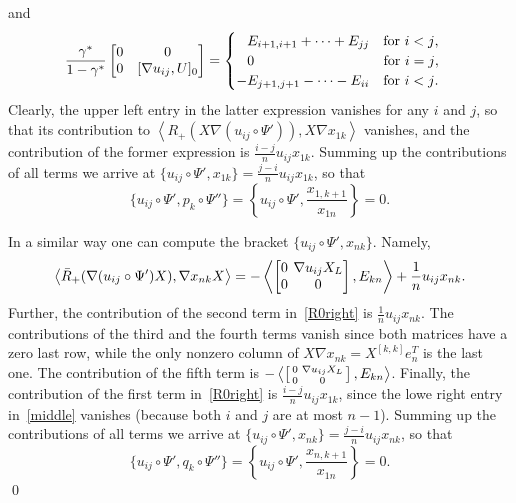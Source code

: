 \documentclass{amsart}
\theoremstyle{definition}
\theoremstyle{remark}
\numberwithin{equation}{section}
\numberwithin{theorem}{section}
\def\nablac{{\nabla}}
\def\nar{\setlength\arraycolsep{2pt}}
\begin{document}
and
\begin{equation}\label{middle}
\frac{\gamma^*}{1-\gamma^*}\begin{bmatrix} 0 & 0\cr 0 & 
[\nablac u_{ij}, U]_0\end{bmatrix}=\begin{cases} \phantom{-}E_{i+1,i+1}+\dots+E_{jj}\quad\text{for $i<j$},\\
                                                 \phantom{-}0\qquad\qquad\qquad\qquad\quad\;\text{for $i=j$},\\
																								 -E_{j+1,j+1}-\dots-E_{ii}\quad\text{for $i<j$}.
																								\end{cases}
\end{equation}
Clearly, the upper left entry in the latter expression vanishes for any $i$ and $j$, so that its contribution
to $\left\langle R_+(X\nabla (u_{ij}\circ\Psi')),X\nabla x_{1k}\right\rangle$ vanishes, and the contribution of
the former expression is $\frac{i-j}n u_{ij}x_{1k}$. Summing up the contributions of all terms we arrive at 
$\{u_{ij}\circ\Psi',x_{1k}\}=\frac{j-i}n u_{ij}x_{1k}$, so that
\[
\{u_{ij}\circ\Psi',p_k\circ\Psi''\}=\left\{u_{ij}\circ\Psi',\frac{x_{1,k+1}}{x_{1n}}\right\}=0.
\]

In a similar way one can compute the bracket $\{u_{ij}\circ\Psi',x_{nk}\}$. Namely,
\[
\left\langle \bar R_+(\nabla (u_{ij}\circ\Psi')X),\nabla x_{nk}X\right\rangle=
-\left\langle \nar\begin{bmatrix} 0 &\nablac u_{ij} X_L\cr 0&0\end{bmatrix},E_{kn}\right\rangle+\frac1n u_{ij}x_{nk}.
\]
Further, the contribution of the second term in~\eqref{R0right} is $\frac1n u_{ij}x_{nk}$. The contributions of the third and the fourth terms vanish since both matrices have a zero last row, while the only nonzero column of 
$X\nabla x_{nk}=X^{[k,k]}e_n^T$ is the last one. The contribution of the fifth term is
$-\left\langle \left[\begin{smallmatrix} 0 &\nablac u_{ij} X_L\cr 0&0\end{smallmatrix}\right],E_{kn}\right\rangle$.
Finally, the contribution of the first term in~\eqref{R0right} is $\frac{i-j}n u_{ij}x_{1k}$, since the lowe right entry in~\eqref{middle} vanishes (because both $i$ and $j$ are at most $n-1$). Summing up the contributions of all terms we arrive at 
$\{u_{ij}\circ\Psi',x_{nk}\}=\frac{j-i}n u_{ij}x_{nk}$, so that
\[
\{u_{ij}\circ\Psi',q_k\circ\Psi''\}=\left\{u_{ij}\circ\Psi',\frac{x_{n,k+1}}{x_{1n}}\right\}=0.
\]
\qed
\end{document}
